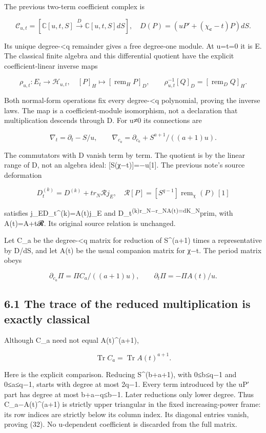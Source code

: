 \documentclass[
  11pt,
]{article}
\begin{document}
The previous two-term coefficient complex is

\[
\mathcal C_{u,t}=[\mathbb C[u,t,S]\xrightarrow{D}\mathbb C[u,t,S]dS],
\quad D(P)=(uP'+(\chi_{\mathbf c}-t)P)dS.
\tag{28}
\]

Its unique degree-\textless q remainder gives a free degree-one module.
At u=t=0 it is E. The classical finite algebra and this differential
quotient have the explicit coefficient-linear inverse maps

\[
\rho_{u,t}:E_t\longrightarrow\mathcal H_{u,t},\quad
[P]_H\longmapsto[\operatorname{rem}_H P]_D,
\qquad
\rho_{u,t}^{-1}[Q]_D=[\operatorname{rem}_D Q]_H.
\tag{28a}
\]

Both normal-form operations fix every degree-\textless q polynomial,
proving the inverse laws. The map is a coefficient-module isomorphism,
not a declaration that multiplication descends through D. For u≠0 its
connections are

\[
\nabla_t=\partial_t-S/u,
\qquad
\nabla_{c_a}=\partial_{c_a}+S^{a+1}/((a+1)u).
\tag{29}
\]

The commutators with D vanish term by term. The quotient is by the
linear range of D, not an algebra ideal: {[}S(χ−t){]}=−u{[}1{]}. The
previous note's source deformation

\[
D_t^{(k)}=D^{(k)}+t r_N\mathcal R j_E,
\quad\mathcal R[P]=[S^{q-1}]\operatorname{rem}_\chi(P)\,[1]
\tag{30}
\]

satisfies j\_ED\_t\^{}(k)=A(t)j\_E and
D\_t\textsuperscript{(k)r\_N−r\_NA(t)=dK\_N}prim, with A(t)=A+t𝓡. Its
original source relation is unchanged.

Let C\_a be the degree-\textless q matrix for reduction of S\^{}(a+1)
times a representative by D/dS, and let A(t) be the usual companion
matrix for χ−t. The period matrix obeys

\[
\partial_{c_a}\Pi=\Pi C_a/((a+1)u),
\qquad \partial_t\Pi=-\Pi A(t)/u.
\tag{31}
\]

\subsection{6.1 The trace of the reduced multiplication is exactly
classical}\label{the-trace-of-the-reduced-multiplication-is-exactly-classical}

Although C\_a need not equal A(t)\^{}(a+1),

\[
\boxed{\operatorname{Tr}C_a=\operatorname{Tr}A(t)^{a+1}.}
\tag{32}
\]

Here is the explicit comparison. Reducing S\^{}(b+a+1), with 0≤b≤q−1 and
0≤a≤q−1, starts with degree at most 2q−1. Every term introduced by the
uP′ part has degree at most b+a−q≤b−1. Later reductions only lower
degree. Thus C\_a−A(t)\^{}(a+1) is strictly upper triangular in the
fixed increasing-power frame: its row indices are strictly below its
column index. Its diagonal entries vanish, proving (32). No u-dependent
coefficient is discarded from the full matrix.
\end{document}
